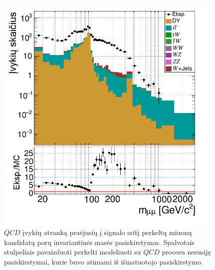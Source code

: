 \documentclass[a4paper, 12pt, oneside]{article}
\newcommand{\QCD}{QC\! D}
\begin{document}
\begin{figure}[b!]
	\RawFloats
	\begin{minipage}{0.48\textwidth}
		\vspace{-0.8cm}
		\includegraphics[width=0.95\textwidth]{Kursinis3/QCDest_subtract.png}
		\vspace{-0.53cm}
		\caption{\label{fig:QCDselection}
			$\QCD$ įvykių atranką praėjusių į signalo sritį perkeltų miuonų kandidatų porų invariantinės masės pasiskirstymas.
			Spalvotais stulpeliais pavaizduoti perkelti modeliuoti su $\QCD$ procesu nesusiję pasiskirstymai, kurie buvo atimami iš
			išmatuotojo pasiskirstymo.
		}
	\end{minipage}
	\hfill
	\begin{minipage}{0.48\textwidth}
		\vspace{-0.5cm}

\end{minipage}
\end{figure}
\end{document}

